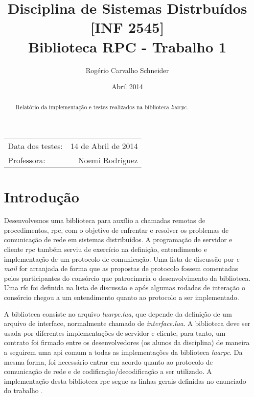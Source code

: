 \documentclass[11pt]{article}
\begin{document}
\title{Disciplina de Sistemas Distrbuídos [INF 2545] \\ Biblioteca RPC -
Trabalho 1}
\author{Rogério Carvalho Schneider}
\date{Abril 2014}
\maketitle

\begin{center}
\begin{tabular}{l r}
Data dos testes: & 14 de Abril de 2014 \\
Professora: & Noemi Rodriguez
\end{tabular}
\end{center}

\begin{abstract}
Relatório da implementação e testes realizados na biblioteca \textit{luarpc}.
\end{abstract}

\doublespacing

\section{Introdução}\label{sec:introduction}

Desenvolvemos uma biblioteca para auxílio a chamadas remotas de
procedimentos, \gls{rpc}, com o objetivo de enfrentar e resolver os problemas
de comunicação de rede em sistemas distribuídos. A programação de servidor e
cliente \gls{rpc} também serviu de exercício na definição, entendimento e
implementação de um protocolo de comunicação. Uma lista de discussão por
\textit{e-mail} for arranjada de forma que as propostas de protocolo fossem
comentadas pelos participantes do consórcio que patrocinaria o desenvolvimento
da biblioteca. Uma \gls{rfc} foi definida na lista de discussão e após algumas
rodadas de interação o consórcio chegou a um entendimento quanto ao protocolo a
ser implementado.

A biblioteca consiste no arquivo \textit{luarpc.lua}, que depende da
definição de um arquivo de interface, normalmente chamado de
\textit{interface.lua}. A biblioteca deve ser usada por diferentes
implementações de servidor e cliente, para tanto, um contrato foi firmado entre
os desenvolvedores (os alunos da disciplina) de maneira a seguirem uma \gls{api}
comum a todas as implementações da biblioteca \textit{luarpc}. Da mesma forma,
foi necessário entrar em acordo quanto ao protocolo de comunicação de rede e de
codificação/decodificação a ser utilizado. A implementação desta
biblioteca \gls{rpc} segue as linhas gerais definidas no enunciado do trabalho
\cite{trab1}.
\end{document}
